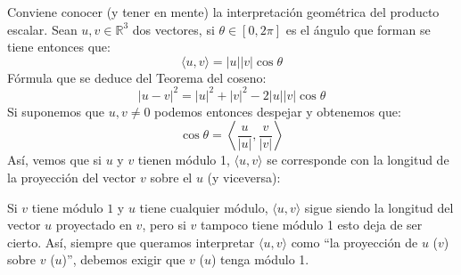 \noindent
Conviene conocer (y tener en mente) la interpretación geométrica del producto escalar. Sean $u,v\in \mathbb{R}^3$ dos vectores, si $\theta\in [0,2\pi]$ es el ángulo que forman se tiene entonces que:
\begin{equation*}
    \langle u,v \rangle = |u||v|\cos\theta
\end{equation*}
Fórmula que se deduce del Teorema del coseno:
\begin{equation*}
    |u-v|^2 = |u|^2 + |v|^2 - 2|u||v|\cos\theta
\end{equation*}
Si suponemos que $u,v\neq 0$ podemos entonces despejar y obtenemos que:
\begin{equation*}
    \cos\theta = \left\langle \frac{u}{|u|},\frac{v}{|v|} \right\rangle 
\end{equation*}
Así, vemos que si $u$ y $v$ tienen módulo 1, $\langle u,v \rangle $ se corresponde con la longitud de la proyección del vector $v$ sobre el $u$ (y viceversa):
\begin{figure}[H]
    \centering
\end{figure}

\noindent
Si $v$ tiene módulo $1$ y $u$ tiene cualquier módulo, $\langle u,v \rangle $ sigue siendo la longitud del vector $u$ proyectado en $v$, pero si $v$ tampoco tiene módulo 1 esto deja de ser cierto. Así, siempre que queramos interpretar $\langle u,v \rangle $ como ``la proyección de $u$ ($v$) sobre $v$ ($u$)'', debemos exigir que $v$ ($u$) tenga módulo 1.

